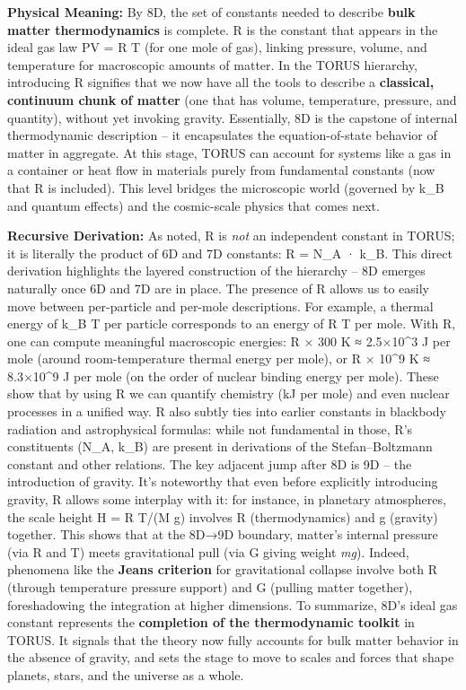 \documentclass[
]{article}
\begin{document}
\textbf{Physical Meaning:} By 8D, the set of constants needed to
describe \textbf{bulk matter thermodynamics} is complete. R is the
constant that appears in the ideal gas law PV = R T (for one mole of
gas), linking pressure, volume, and temperature for macroscopic amounts
of matter\hspace{0pt}. In the TORUS hierarchy, introducing R signifies
that we now have all the tools to describe a \textbf{classical,
continuum chunk of matter} (one that has volume, temperature, pressure,
and quantity), without yet invoking gravity. Essentially, 8D is the
capstone of internal thermodynamic description -- it encapsulates the
equation-of-state behavior of matter in aggregate. At this stage, TORUS
can account for systems like a gas in a container or heat flow in
materials purely from fundamental constants (now that R is included).
This level bridges the microscopic world (governed by k\_B and quantum
effects) and the cosmic-scale physics that comes next.

\textbf{Recursive Derivation:} As noted, R is \emph{not} an independent
constant in TORUS; it is literally the product of 6D and 7D constants: R
= N\_A · k\_B\hspace{0pt}. This direct derivation highlights the layered
construction of the hierarchy -- 8D emerges naturally once 6D and 7D are
in place. The presence of R allows us to easily move between
per-particle and per-mole descriptions. For example, a thermal energy of
k\_B T per particle corresponds to an energy of R T per mole. With R,
one can compute meaningful macroscopic energies: R × 300 K ≈ 2.5×10\^{}3
J per mole (around room-temperature thermal energy per mole), or R ×
10\^{}9 K ≈ 8.3×10\^{}9 J per mole (on the order of nuclear binding
energy per mole)\hspace{0pt}. These show that by using R we can quantify
chemistry (kJ per mole) and even nuclear processes in a unified way. R
also subtly ties into earlier constants in blackbody radiation and
astrophysical formulas: while not fundamental in those, R's constituents
(N\_A, k\_B) are present in derivations of the Stefan--Boltzmann
constant and other relations\hspace{0pt}. The key adjacent jump after 8D
is 9D -- the introduction of gravity. It's noteworthy that even before
explicitly introducing gravity, R allows some interplay with it: for
instance, in planetary atmospheres, the scale height H = R T/(M g)
involves R (thermodynamics) and g (gravity) together\hspace{0pt}. This
shows that at the 8D→9D boundary, matter's internal pressure (via R and
T) meets gravitational pull (via G giving weight \emph{mg}). Indeed,
phenomena like the \textbf{Jeans criterion} for gravitational collapse
involve both R (through temperature pressure support) and G (pulling
matter together), foreshadowing the integration at higher dimensions. To
summarize, 8D's ideal gas constant represents the \textbf{completion of
the thermodynamic toolkit} in TORUS. It signals that the theory now
fully accounts for bulk matter behavior in the absence of gravity, and
sets the stage to move to scales and forces that shape planets, stars,
and the universe as a whole.
\end{document}
